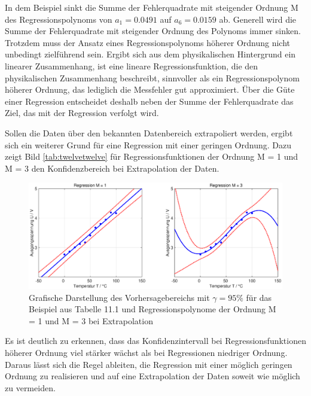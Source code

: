 \noindent In dem Beispiel sinkt die Summe der Fehlerquadrate mit steigender Ordnung M des Regressionspolynoms von $a_{1} = 0.0491$ auf $a_{6} = 0.0159$ ab. Generell wird die Summe der Fehlerquadrate mit steigender Ordnung des Polynoms immer sinken. Trotzdem muss der Ansatz eines Regressionspolynoms h\"{o}herer Ordnung nicht unbedingt zielf\"{u}hrend sein. Ergibt sich aus dem physikalischen Hintergrund ein linearer Zusammenhang, ist eine lineare Regressionsfunktion, die den physikalischen Zusammenhang beschreibt, sinnvoller als ein Regressionspolynom h\"{o}herer Ordnung, das lediglich die Messfehler gut approximiert. \"{U}ber die G\"{u}te einer Regression entscheidet deshalb neben der Summe der Fehlerquadrate das Ziel, das mit der Regression verfolgt wird.\newline

\noindent Sollen die Daten \"{u}ber den bekannten Datenbereich extrapoliert werden, ergibt sich ein weiterer Grund f\"{u}r eine Regression mit einer geringen Ordnung. Dazu zeigt Bild \ref{tab:twelvetwelve} f\"{u}r Regressionsfunktionen der Ordnung M = 1 und M = 3 den Konfidenzbereich bei Extrapolation der Daten.

\noindent 
\begin{figure}[H]
  \centerline{\includegraphics[width=1\textwidth]{Kapitel12/Bilder/image11}}
  \caption{Grafische Darstellung des Vorhersagebereichs mit $\gamma = 95 \%$ f\"{u}r das Beispiel aus Tabelle 11.1 und Regressionspolynome der Ordnung M = 1 und M = 3 bei Extrapolation}
  \label{fig:RegressionLinearOeltemperatur8}
\end{figure}

\noindent Es ist deutlich zu erkennen, dass das Konfidenzintervall bei Regressionsfunktionen h\"{o}herer Ordnung viel st\"{a}rker w\"{a}chst als bei Regressionen niedriger Ordnung. Daraus l\"{a}sst sich die Regel ableiten, die Regression mit einer m\"{o}glich geringen Ordnung zu realisieren und auf eine Extrapolation der Daten soweit wie m\"{o}glich zu vermeiden.\newline

